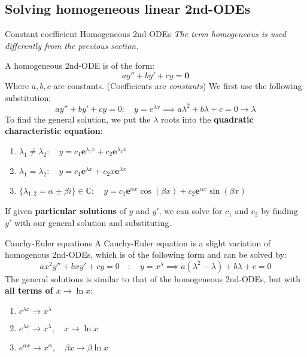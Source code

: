 \subsection{Solving homogeneous linear 2nd-ODEs}

\label{sec:homogeneous}
\begin{definition}
    {Constant coefficient Homogeneous 2nd-ODEs}
    \emph{The term homogeneous is used differently from the previous section.}

    A homogeneous 2nd-ODE is of the form:
    \[ay''+by'+cy=\mathbf{0}\]
    Where $a,b,c$ are constants. (Coefficients are \emph{constants})
    \tcblower
    We first use the following substitution:
    \[ay''+by'+cy=0:\quad y=e^{\lambda x}\implies a\lambda^2+b\lambda+c=0\to \lambda\]
    To find the general solution, we put the $\lambda$ roots into the \textbf{quadratic characteristic equation}:
    \begin{enumerate}
        \item $\lambda_1\ne\lambda_2:\quad y=c_1\mathbf{e}^{\lambda_1x}+c_2\mathbf{e}^{\lambda_2x}$
        \item $\lambda_1=\lambda_2:\quad y=c_1\mathbf{e}^{\lambda x}+c_2x\mathbf{e}^{\lambda x}$
        \item $\{\lambda_{1,2}=\alpha\pm\beta i\}\in\mathds{C}:\quad y=c_{1}\mathbf{e}^{\alpha x}\cos(\beta x)+c_{2}\mathbf{e}^{\alpha x}\sin(\beta x)$
    \end{enumerate}
    If given \textbf{particular solutions} of $y$ and $y'$, we can solve for $c_1$ and $c_2$ by finding $y'$ with our general solution and substituting.
\end{definition}

\begin{definition}
    {Cauchy-Euler equations}
    A Cauchy-Euler equation is a slight variation of homogenous 2nd-ODEs, which is of the following form and can be solved by:
    \[ax^2y''+bxy'+cy=0\quad:\quad y=x^\lambda\implies a(\lambda^2-\lambda)+b\lambda+c=0\]
    The general solutions is similar to that of the homogeneous 2nd-ODEs, but with \textbf{all terms of $x\to \ln x$}:
    \begin{enumerate}
        \item $e^{\lambda x}\to x^\lambda$
        \item $e^{\lambda x}\to x^\lambda,\quad x\to \ln x$
        \item $e^{\alpha x}\to x^\alpha,\quad \beta x \to \beta \ln x$
    \end{enumerate}
\end{definition}

